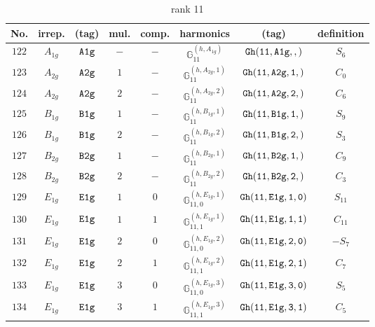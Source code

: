 \documentclass[fleqn,8pt]{jsarticle}
\begin{document}
\begin{table}[ht!]
\begin{center}
\caption{rank 11}
\renewcommand{\arraystretch}{1.3}
\begin{tabular}{cccccccc} \hline \hline
No. & irrep. & (tag) & mul. & comp. & harmonics & (tag) & definition \\ \hline
$ 122 $ & $ A_{1g} $ & $ {\tt A1g} $ & $ - $ & $ - $ & $ \mathbb{G}_{11}^{(h,A_{1g})} $ & $ {\tt Gh(11,A1g,,)} $ & $ S_{6} $ \\
$ 123 $ & $ A_{2g} $ & $ {\tt A2g} $ & $ 1 $ & $ - $ & $ \mathbb{G}_{11}^{(h,A_{2g},1)} $ & $ {\tt Gh(11,A2g,1,)} $ & $ C_{0} $ \\
$ 124 $ & $ A_{2g} $ & $ {\tt A2g} $ & $ 2 $ & $ - $ & $ \mathbb{G}_{11}^{(h,A_{2g},2)} $ & $ {\tt Gh(11,A2g,2,)} $ & $ C_{6} $ \\
$ 125 $ & $ B_{1g} $ & $ {\tt B1g} $ & $ 1 $ & $ - $ & $ \mathbb{G}_{11}^{(h,B_{1g},1)} $ & $ {\tt Gh(11,B1g,1,)} $ & $ S_{9} $ \\
$ 126 $ & $ B_{1g} $ & $ {\tt B1g} $ & $ 2 $ & $ - $ & $ \mathbb{G}_{11}^{(h,B_{1g},2)} $ & $ {\tt Gh(11,B1g,2,)} $ & $ S_{3} $ \\
$ 127 $ & $ B_{2g} $ & $ {\tt B2g} $ & $ 1 $ & $ - $ & $ \mathbb{G}_{11}^{(h,B_{2g},1)} $ & $ {\tt Gh(11,B2g,1,)} $ & $ C_{9} $ \\
$ 128 $ & $ B_{2g} $ & $ {\tt B2g} $ & $ 2 $ & $ - $ & $ \mathbb{G}_{11}^{(h,B_{2g},2)} $ & $ {\tt Gh(11,B2g,2,)} $ & $ C_{3} $ \\
$ 129 $ & $ E_{1g} $ & $ {\tt E1g} $ & $ 1 $ & $ 0 $ & $ \mathbb{G}_{11,0}^{(h,E_{1g},1)} $ & $ {\tt Gh(11,E1g,1,0)} $ & $ S_{11} $ \\
$ 130 $ & $ E_{1g} $ & $ {\tt E1g} $ & $ 1 $ & $ 1 $ & $ \mathbb{G}_{11,1}^{(h,E_{1g},1)} $ & $ {\tt Gh(11,E1g,1,1)} $ & $ C_{11} $ \\
$ 131 $ & $ E_{1g} $ & $ {\tt E1g} $ & $ 2 $ & $ 0 $ & $ \mathbb{G}_{11,0}^{(h,E_{1g},2)} $ & $ {\tt Gh(11,E1g,2,0)} $ & $ - S_{7} $ \\
$ 132 $ & $ E_{1g} $ & $ {\tt E1g} $ & $ 2 $ & $ 1 $ & $ \mathbb{G}_{11,1}^{(h,E_{1g},2)} $ & $ {\tt Gh(11,E1g,2,1)} $ & $ C_{7} $ \\
$ 133 $ & $ E_{1g} $ & $ {\tt E1g} $ & $ 3 $ & $ 0 $ & $ \mathbb{G}_{11,0}^{(h,E_{1g},3)} $ & $ {\tt Gh(11,E1g,3,0)} $ & $ S_{5} $ \\
$ 134 $ & $ E_{1g} $ & $ {\tt E1g} $ & $ 3 $ & $ 1 $ & $ \mathbb{G}_{11,1}^{(h,E_{1g},3)} $ & $ {\tt Gh(11,E1g,3,1)} $ & $ C_{5} $ \\

\end{tabular}
\end{center}
\end{table}
\end{document}
